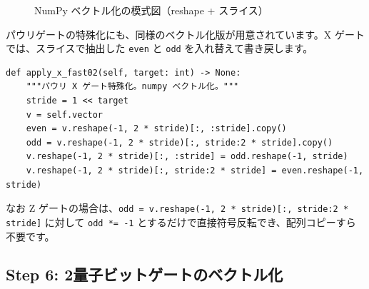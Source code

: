 \begin{figure}[htbp]
\caption{NumPy ベクトル化の模式図（reshape + スライス）}
\label{fig:numpy_vectorization}
\end{figure}

パウリゲートの特殊化にも、同様のベクトル化版が用意されています。X ゲートでは、スライスで抽出した \texttt{even} と \texttt{odd} を入れ替えて書き戻します。

\begin{lstlisting}[caption=パウリXゲート特殊化のベクトル化版（qubit.py）, label=src:pauli_vectorized]
def apply_x_fast02(self, target: int) -> None:
    """パウリ X ゲート特殊化。numpy ベクトル化。"""
    stride = 1 << target
    v = self.vector
    even = v.reshape(-1, 2 * stride)[:, :stride].copy()
    odd = v.reshape(-1, 2 * stride)[:, stride:2 * stride].copy()
    v.reshape(-1, 2 * stride)[:, :stride] = odd.reshape(-1, stride)
    v.reshape(-1, 2 * stride)[:, stride:2 * stride] = even.reshape(-1, stride)
\end{lstlisting}

なお Z ゲートの場合は、\texttt{odd = v.reshape(-1, 2 * stride)[:, stride:2 * stride]} に対して \texttt{odd *= -1} とするだけで直接符号反転でき、配列コピーすら不要です。

\subsection{Step 6: 2量子ビットゲートのベクトル化}

